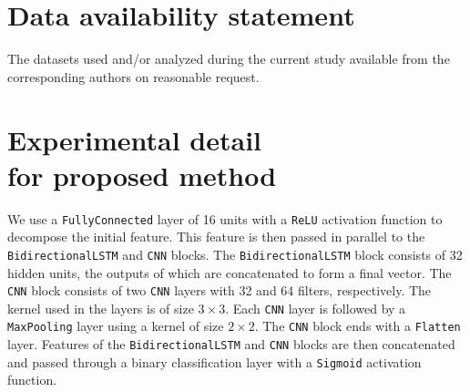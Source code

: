 \documentclass[aps,prb,groupedaddress,twocolumn,showpacs,dvipdfmx,superscriptaddress,pdftex]{revtex4-2}
\begin{document}
\section{Data availability statement}
The datasets used and/or analyzed during the current study available from the corresponding authors on reasonable request.

\clearpage
% 


\clearpage

\appendix
\section{Experimental detail\\for proposed method}
\label{app:our_experiment}


We use a \verb|FullyConnected| layer of 16 units with a \verb|ReLU| activation function to decompose the initial feature. This feature is then passed in parallel to the \verb|BidirectionalLSTM| and \verb|CNN| blocks. The \verb|BidirectionalLSTM| block consists of 32 hidden units, the outputs of which are concatenated to form a final vector. The \verb|CNN| block consists of two \verb|CNN| layers with 32 and 64 filters, respectively. The kernel used in the layers is of size $3\times 3$. Each \verb|CNN| layer is followed by a \verb|MaxPooling| layer using a kernel of size $2\times 2$. The \verb|CNN| block ends with a \verb|Flatten| layer. Features of the \verb|BidirectionalLSTM| and \verb|CNN| blocks are then concatenated and passed through a binary classification layer with a \verb|Sigmoid| activation function.
\end{document}
